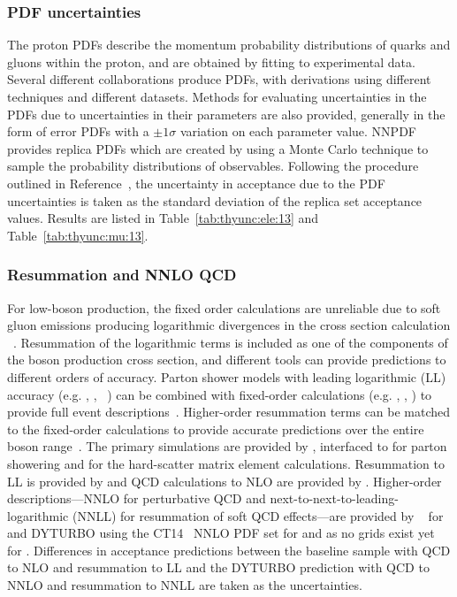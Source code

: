 \subsubsection{PDF uncertainties}
The proton PDFs describe the momentum probability distributions of quarks and gluons within the proton, and are obtained by fitting to experimental data. Several different collaborations produce PDFs, with derivations using different techniques and different datasets. Methods for evaluating uncertainties in the PDFs due to uncertainties in their parameters are also provided, generally in the form of error PDFs with a $\pm 1 \sigma$ variation on each parameter value. NNPDF provides replica PDFs which are created by using a Monte Carlo technique to sample the probability distributions of observables. Following the procedure outlined in Reference~\cite{Butterworth:2015oua}, the uncertainty in acceptance due to the PDF uncertainties is taken as the standard deviation of the replica set acceptance values. Results are listed in Table~\ref{tab:thyunc:ele:13} and Table~\ref{tab:thyunc:mu:13}.

\subsubsection{Resummation and NNLO QCD}\label{ch:resummation}
For low-\pt boson production, the fixed order calculations are unreliable due to soft gluon emissions producing logarithmic divergences in the cross section calculation
~\cite{Collins:1984kg}. Resummation of the logarithmic terms is included as one of the components of the boson production cross section, and different tools can provide predictions to different orders of accuracy. Parton shower models with leading logarithmic (LL) accuracy (e.g. \PYTHIA, \SHERPA, \HERWIG ~\cite{Sjostrand:2014zea,Gleisberg:2008ta,Bahr:2008pv}) can be combined with fixed-order calculations (e.g. \aMCATNLO, \MINLO, \POWHEG) to provide full event descriptions~\cite{Nason:2004rx,Frixione:2002ik,Alioli:2010xd,Alwall:2014hca}. Higher-order resummation terms can be matched to the fixed-order calculations to provide accurate predictions over the entire boson \pt range~\cite{Balazs:1995nz,Catani:2015vma}. 
The primary simulations are provided by \aMCATNLO, interfaced to  for parton showering and  for the hard-scatter matrix element calculations. Resummation to LL is provided by  and QCD calculations to NLO are provided by . Higher-order descriptions---NNLO for perturbative QCD and next-to-next-to-leading-logarithmic (NNLL) for resummation of soft QCD effects---are provided by \RESBOS~\cite{Ladinsky:1993zn, Balazs:1997xd, Landry:2002ix} for \sh and DYTURBO using the CT14~\cite{Dulat:2015mca} NNLO PDF set for \sh and \sg as no \RESBOS grids exist yet for \sg. Differences in acceptance predictions between the baseline sample with QCD to NLO and resummation to LL and the DYTURBO prediction with QCD to NNLO and resummation to NNLL are taken as the uncertainties.

